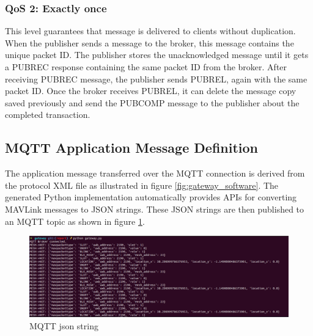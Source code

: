 \documentclass[\main/thesis.tex]{subfiles}
\begin{document}
\subsubsection{QoS 2: Exactly once}


This level guarantees that message is delivered to clients without  duplication. When the publisher sends a message to the broker, this message contains the unique packet ID. The publisher stores the unacknowledged message until it gets a PUBREC response containing the same packet ID from the broker. After receiving PUBREC message, the publisher sends PUBREL, again with the same packet ID. Once the broker receives PUBREL, it can delete the message copy saved previously and send the PUBCOMP message to the publisher about the completed transaction.

\subsection{MQTT Application Message Definition}
The application message transferred over the MQTT connection is derived from the protocol XML file as illustrated in figure \ref{fig:gateway_software}. The generated Python implementation automatically provides APIs for converting MAVLink messages to JSON strings.  These JSON strings are then published to an MQTT topic as shown in figure \ref{fig:mqtt_json_string}.

\begin{figure}[H]
    \begin{center}
        \includegraphics[width=1\textwidth]{mqtt_json_string.png}
    \end{center}
    \caption{MQTT json string}
    \label{fig:mqtt_json_string}
\end{figure}
\end{document}
